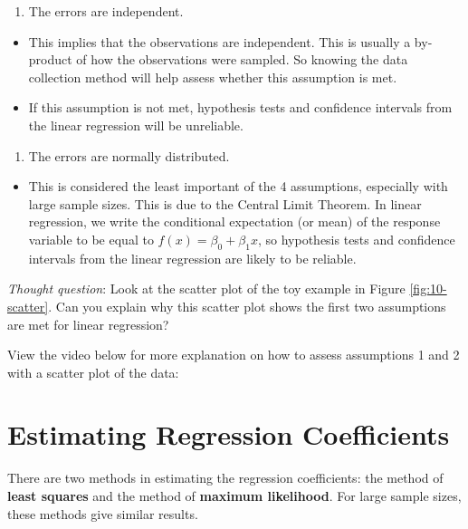 \documentclass[
]{book}
\providecommand{\tightlist}{%
  \setlength{\itemsep}{0pt}\setlength{\parskip}{0pt}}
\begin{document}
\begin{enumerate}
\def\labelenumi{\arabic{enumi}.}
\setcounter{enumi}{2}
\tightlist
\item
  The errors are independent.
\end{enumerate}

\begin{itemize}
\tightlist
\item
  This implies that the observations are independent. This is usually a by-product of how the observations were sampled. So knowing the data collection method will help assess whether this assumption is met.
\item
  If this assumption is not met, hypothesis tests and confidence intervals from the linear regression will be unreliable.
\end{itemize}

\begin{enumerate}
\def\labelenumi{\arabic{enumi}.}
\setcounter{enumi}{3}
\tightlist
\item
  The errors are normally distributed.
\end{enumerate}

\begin{itemize}
\tightlist
\item
  This is considered the least important of the 4 assumptions, especially with large sample sizes. This is due to the Central Limit Theorem. In linear regression, we write the conditional expectation (or mean) of the response variable to be equal to \(f(x) = \beta_0 + \beta_1 x\), so hypothesis tests and confidence intervals from the linear regression are likely to be reliable.
\end{itemize}

\emph{Thought question}: Look at the scatter plot of the toy example in Figure \ref{fig:10-scatter}. Can you explain why this scatter plot shows the first two assumptions are met for linear regression?

View the video below for more explanation on how to assess assumptions 1 and 2 with a scatter plot of the data:

\hypertarget{estSLR}{%
\section{Estimating Regression Coefficients}\label{estSLR}}

There are two methods in estimating the regression coefficients: the method of \textbf{least squares} and the method of \textbf{maximum likelihood}. For large sample sizes, these methods give similar results.
\end{document}
